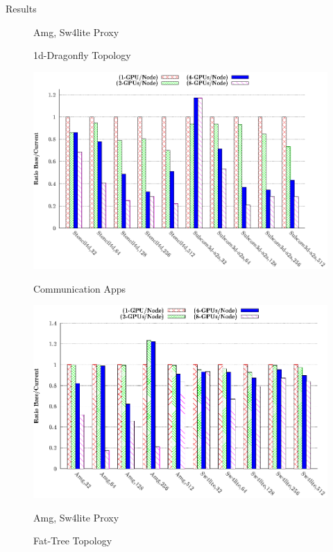 \documentclass[final]{beamer}
\newlength{\onecolwid}
\newlength{\twocolwid}
\begin{document}
\begin{frame}[t]
\begin{columns}[t]
\begin{column}{\twocolwid}
\begin{columns}[t,totalwidth=\twocolwid]
\begin{column}{\onecolwid}
\begin{block}{Results}
\begin{figure}
\begin{minipage}{.45\textwidth}
\captionsetup{labelformat=empty}
\caption{Amg, Sw4lite Proxy}
\label{fig:13b}
\end{minipage}
\captionsetup{labelformat=empty}
\caption{1d-Dragonfly Topology}
\end{figure}

\begin{figure}
\centering
\begin{minipage}{.45\textwidth}
\centering
\includegraphics[width=1\linewidth]{figs/ftree-x-mapping-comm.eps}
\captionsetup{labelformat=empty}
\caption{Communication Apps}
\label{fig:13a}
\end{minipage}
\begin{minipage}{.45\textwidth}
\centering
\includegraphics[width=1\linewidth]{figs/ftree-x-mapping-comp-new.eps}
\captionsetup{labelformat=empty}
\caption{Amg, Sw4lite Proxy}
\label{fig:13b}
\end{minipage}
\captionsetup{labelformat=empty}
\caption{Fat-Tree Topology}
\end{figure}



\end{block}
\end{column}
\end{columns}
\end{column}
\end{columns}
\end{frame}
\end{document}
